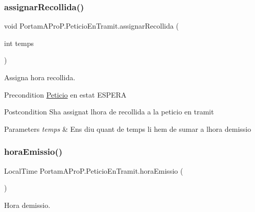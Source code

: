 \subsubsection{\texorpdfstring{assignar\+Recollida()}{assignarRecollida()}}
{\footnotesize\ttfamily void Portam\+A\+Pro\+P.\+Peticio\+En\+Tramit.\+assignar\+Recollida (\begin{DoxyParamCaption}\item[{int}]{temps }\end{DoxyParamCaption})}



Assigna hora recollida. 

\begin{DoxyPrecond}{Precondition}
\hyperlink{class_portam_a_pro_p_1_1_peticio}{Peticio} en estat E\+S\+P\+E\+RA 
\end{DoxyPrecond}
\begin{DoxyPostcond}{Postcondition}
S\textquotesingle{}ha assignat l\textquotesingle{}hora de recollida a la peticio en tramit 
\end{DoxyPostcond}

\begin{DoxyParams}{Parameters}
{\em temps} & Ens diu quant de temps li hem de sumar a l\textquotesingle{}hora d\textquotesingle{}emissio \\
\hline
\end{DoxyParams}
\mbox{\label{class_portam_a_pro_p_1_1_peticio_en_tramit_a21786731d8752541a29aacbd6756f26f}} 
\subsubsection{\texorpdfstring{hora\+Emissio()}{horaEmissio()}}
{\footnotesize\ttfamily Local\+Time Portam\+A\+Pro\+P.\+Peticio\+En\+Tramit.\+hora\+Emissio (\begin{DoxyParamCaption}{ }\end{DoxyParamCaption})}



Hora d\textquotesingle{}emissio. 

